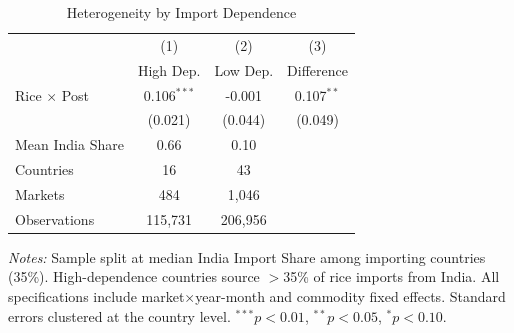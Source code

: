 \begin{table}[htbp]
\centering
\caption{Heterogeneity by Import Dependence}
\label{tab:hetero}
\begin{threeparttable}
\begin{tabular}{lccc}
\hline\hline
 & (1) & (2) & (3) \\
 & High Dep. & Low Dep. & Difference \\
\hline
Rice $\times$ Post & 0.106$^{***}$ & -0.001 & 0.107$^{**}$ \\
 & (0.021) & (0.044) & (0.049) \\
\hline
Mean India Share & 0.66 & 0.10 & \\
Countries & 16 & 43 & \\
Markets & 484 & 1,046 & \\
Observations & 115,731 & 206,956 & \\
\hline\hline
\end{tabular}
\begin{tablenotes}[flushleft]\small
\item \textit{Notes:} Sample split at median India Import Share among importing countries (35\%). High-dependence countries source $>$35\% of rice imports from India. All specifications include market$\times$year-month and commodity fixed effects. Standard errors clustered at the country level. $^{***}p<0.01$, $^{**}p<0.05$, $^{*}p<0.10$.
\end{tablenotes}
\end{threeparttable}
\end{table}

